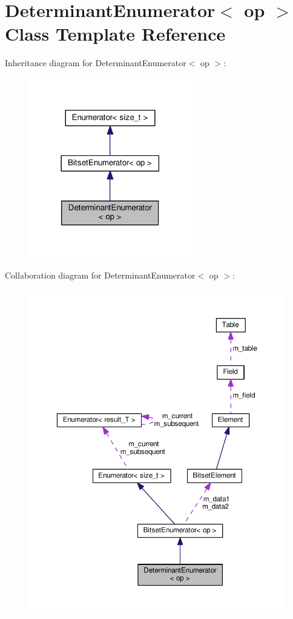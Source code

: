 \hypertarget{classDeterminantEnumerator}{}\section{Determinant\+Enumerator$<$ op $>$ Class Template Reference}
\label{classDeterminantEnumerator}


Inheritance diagram for Determinant\+Enumerator$<$ op $>$\+:
\nopagebreak
\begin{figure}[H]
\begin{center}
\leavevmode
\includegraphics[width=201pt]{classDeterminantEnumerator__inherit__graph}
\end{center}
\end{figure}


Collaboration diagram for Determinant\+Enumerator$<$ op $>$\+:
\nopagebreak
\begin{figure}[H]
\begin{center}
\leavevmode
\includegraphics[width=350pt]{classDeterminantEnumerator__coll__graph}
\end{center}
\end{figure}
